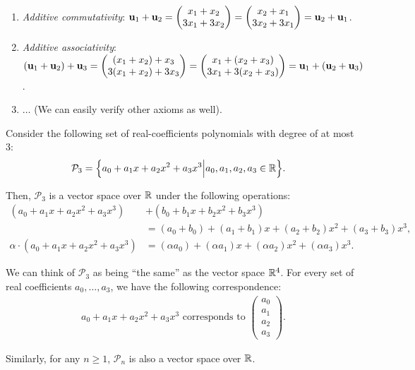 \begin{example}
\begin{enumerate}
		\item \emph{Additive commutativity}: ${\bf u}_1 + {\bf u}_2 = \begin{pmatrix} x_1 + x_2 \\ 3x_1 + 3x_2 \end{pmatrix} = \begin{pmatrix} x_2 + x_1 \\ 3x_2 + 3x_1 \end{pmatrix} = {\bf u}_2 + {\bf u}_1$.

		\item \emph{Additive associativity}: $({\bf u}_1 + {\bf u}_2) + {\bf u}_3 = \begin{pmatrix} (x_1 + x_2) + x_3 \\ 3(x_1 + x_2) + 3x_3\end{pmatrix}=\begin{pmatrix} x_1 + (x_2 + x_3) \\ 3x_1 + 3(x_2 + x_3)\end{pmatrix} = {\bf u}_1 + ({\bf u}_2 + {\bf u}_3)$.

		\item $\dots$ (We can easily verify other axioms as well).
	\end{enumerate} 
\end{example} 

\begin{example}
	Consider the following set of real-coefficients polynomials with degree of at most 3:
	\begin{align*}
		\mathcal{P}_3 &= \Big\{ 
			a_0 + a_1x + a_2x^2 + a_3x^3 \Big| a_0, a_1, a_2, a_3\in\mathbb{R}
		 \Big\}.
	\end{align*} 

	\noindent Then, $\mathcal{P}_3$ is a vector space over $\mathbb{R}$ under the following operations:
	\begin{align*}
		(a_0 + a_1x + a_2x^2 + a_3x^3) &+ (b_0 + b_1x + b_2x^2 + b_3x^3) \\
			&= (a_0 + b_0) + (a_1 + b_1)x + (a_2 + b_2)x^2 + (a_3 + b_3)x^3, \\
		\alpha\cdot(a_0 + a_1x + a_2x^2 + a_3x^3) &= (\alpha a_0) + (\alpha a_1) x + (\alpha a_2) x^2 + (\alpha a_3) x^3.
	\end{align*} 

	\noindent We can think of $\mathcal{P}_3$ as being ``the same'' as the vector space $\mathbb{R}^4$. For every set of real coefficients $a_0, \dots, a_3$, we have the following correspondence:
	\begin{align*}
		a_0 + a_1x + a_2x^2 + a_3x^3 \text{ corresponds to } \begin{pmatrix}
			a_0 \\ a_1 \\ a_2 \\ a_3	
		\end{pmatrix}.
	\end{align*}

	\noindent Similarly, for any $n\ge 1$, $\mathcal{P}_n$ is also a vector space over $\mathbb{R}$.
\end{example} 

